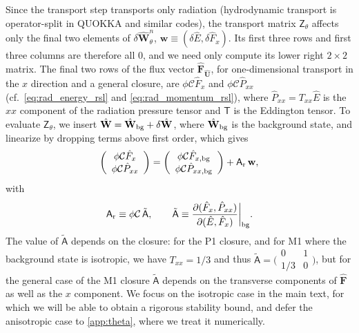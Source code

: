 \documentclass[preprint,12pt,authoryear]{elsarticle}
\newcommand{\tenA}{\mathsf{A}}
\newcommand{\tenZ}{\mathsf{Z}}
\newcommand{\hE}{\hat{E}}
\newcommand{\hF}{\hat{F}}
\newcommand{\hP}{\hat{P}}
\newcommand{\hvecF}{\hat{\mathbf{F}}}
\newcommand{\hvecFU}{\hat{\mathbf{F}}_{\hat{\mathbf{U}}}}
\newcommand{\hvecW}{{\hat{\mathbf{W}}}}
\newcommand{\calC}{\mathcal{C}}
\begin{document}
Since the transport step transports only radiation (hydrodynamic transport is operator-split in QUOKKA and similar codes), the transport matrix $\tenZ_\theta$ affects only the final two elements of $\delta\hvecW^n_\theta$, $\mathbf{w} \equiv (\delta\hE, \delta\hF_x)$. Its first three rows and first three columns are therefore all 0, and we need only compute its lower right $2\times 2$ matrix. The final two rows of the flux vector $\hvecFU$, for one-dimensional transport in the $x$ direction and a general closure, are $\phi \calC\hF_x$ and $\phi\calC\hP_{xx}$ (cf.~\autoref{eq:rad_energy_rsl} and \autoref{eq:rad_momentum_rsl}), where $\hP_{xx} = T_{xx} \hE$ is the $xx$ component of the radiation pressure tensor and $\mathsf{T}$ is the Eddington tensor. To evaluate $\tenZ_\theta$, we insert $\hvecW = \hvecW_{\rm bg} + \delta\hvecW$, where $\hvecW_{\rm bg}$ is the background state, and linearize by dropping terms above first order, which gives
\begin{equation}
    \left(\begin{array}{c} \phi\calC\hF_x \\ \phi\calC\hat{P}_{xx} \end{array}\right)
    = \left(\begin{array}{c} \phi\calC\hF_{x,\mathrm{bg}} \\ \phi\calC\hat{P}_{xx,\mathrm{bg}} \end{array}\right)
    + \tenA_{\rm r}\,\mathbf{w},
    \label{eq:flux_von_neumann}
\end{equation}
with
\begin{equation}
    \tenA_{\rm r} \equiv \phi\calC\,\tilde{\tenA},\qquad \tilde{\tenA} \equiv \frac{\partial(\hF_x, \hat{P}_{xx})}{\partial(\hE, \hF_x)}\bigg|_{\rm bg}.
    \label{eq:flux_split}
\end{equation}
The value of $\tilde{\tenA}$ depends on the closure: for the P1 closure, and for M1 where the background state is isotropic, we have $T_{xx} = 1/3$ and thus $\tilde{\tenA} = \bigl(\begin{smallmatrix} 0 & 1 \\ 1/3 & 0 \end{smallmatrix}\bigr)$, but for the general case of the M1 closure $\tilde{\tenA}$ depends on the transverse components of $\hvecF$ as well as the $x$ component. We focus on the isotropic case in the main text, for which we will be able to obtain a rigorous stability bound, and defer the anisotropic case to \ref{app:theta}, where we treat it numerically.
\end{document}
